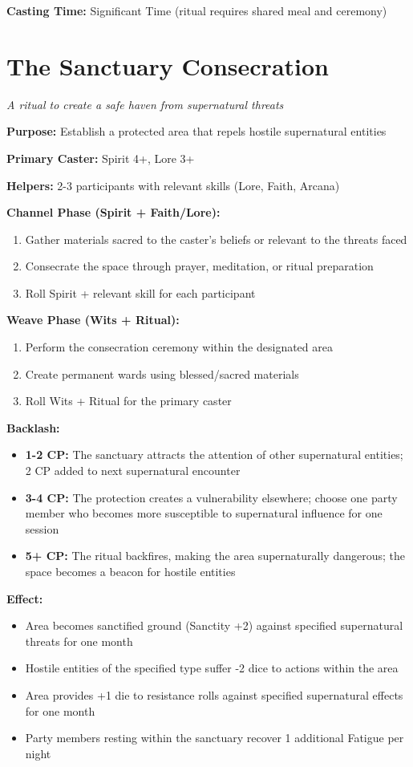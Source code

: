 \documentclass[12pt,twoside]{book}
\begin{document}
\textbf{Casting Time:} Significant Time (ritual requires shared meal and ceremony)

\section*{The Sanctuary Consecration}
\textit{A ritual to create a safe haven from supernatural threats}

\textbf{Purpose:} Establish a protected area that repels hostile supernatural entities

\textbf{Primary Caster:} Spirit 4+, Lore 3+

\textbf{Helpers:} 2-3 participants with relevant skills (Lore, Faith, Arcana)

\textbf{Channel Phase (Spirit + Faith/Lore):}
\begin{enumerate}
\item Gather materials sacred to the caster's beliefs or relevant to the threats faced
\item Consecrate the space through prayer, meditation, or ritual preparation
\item Roll Spirit + relevant skill for each participant
\end{enumerate}

\textbf{Weave Phase (Wits + Ritual):}
\begin{enumerate}
\item Perform the consecration ceremony within the designated area
\item Create permanent wards using blessed/sacred materials
\item Roll Wits + Ritual for the primary caster
\end{enumerate}

\textbf{Backlash:}
\begin{itemize}
\item \textbf{1-2 CP:} The sanctuary attracts the attention of other supernatural entities; 2 CP added to next supernatural encounter
\item \textbf{3-4 CP:} The protection creates a vulnerability elsewhere; choose one party member who becomes more susceptible to supernatural influence for one session
\item \textbf{5+ CP:} The ritual backfires, making the area supernaturally dangerous; the space becomes a beacon for hostile entities
\end{itemize}

\textbf{Effect:}
\begin{itemize}
\item Area becomes sanctified ground (Sanctity +2) against specified supernatural threats for one month
\item Hostile entities of the specified type suffer -2 dice to actions within the area
\item Area provides +1 die to resistance rolls against specified supernatural effects for one month
\item Party members resting within the sanctuary recover 1 additional Fatigue per night
\end{itemize}
\end{document}
